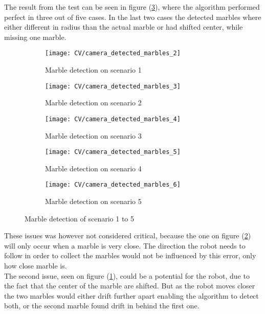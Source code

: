\documentclass[../Head/Main.tex]{subfiles}
\begin{document}
The result from the test can be seen in figure (\ref{fig:md_1_5}), where the algorithm performed perfect in three out of five cases. In the last two cases the detected marbles where either different in radius than the actual marble or had shifted center, while missing one marble.
\begin{figure}[H]
	\centering
	\begin{subfigure}[b]{0.196\textwidth}
		\centering
		\texttt{[image: CV/camera\_detected\_marbles\_2]}
		\caption{Marble detection on scenario 1}
	\end{subfigure}
	\hfill
	\begin{subfigure}[b]{0.196\textwidth}
		\centering
		\texttt{[image: CV/camera\_detected\_marbles\_3]}
		\caption{Marble detection on scenario 2}
		\label{fig:md_2_impl}
	\end{subfigure}
	\hfill
	\begin{subfigure}[b]{0.196\textwidth}
		\centering
		\texttt{[image: CV/camera\_detected\_marbles\_4]}
		\caption{Marble detection on scenario 3}
	\end{subfigure}
	\hfill
	\begin{subfigure}[b]{0.196\textwidth}
		\centering
		\texttt{[image: CV/camera\_detected\_marbles\_5]}
		\caption{Marble detection on scenario 4}
		\label{fig:md_4_impl}
	\end{subfigure}
	\hfill
	\begin{subfigure}[b]{0.196\textwidth}
		\centering
		\texttt{[image: CV/camera\_detected\_marbles\_6]}
		\caption{Marble detection on scenario 5}
	\end{subfigure}
	\caption{Marble detection of scenario 1 to 5}
	\label{fig:md_1_5}
\end{figure} 
These issues was however not considered critical, because the one on figure (\ref{fig:md_4_impl}) will only occur when a marble is very close. The direction the robot needs to follow in order to collect the marbles would not be influenced by this error, only how close marble is.\\
The second issue, seen on figure (\ref{fig:md_2_impl}), could be a potential for the robot, due to the fact that the center of the marble are shifted. But as the robot moves closer the two marbles would either drift further apart enabling the algorithm to detect both, or the second marble found drift in behind the first one. 
\end{document}
